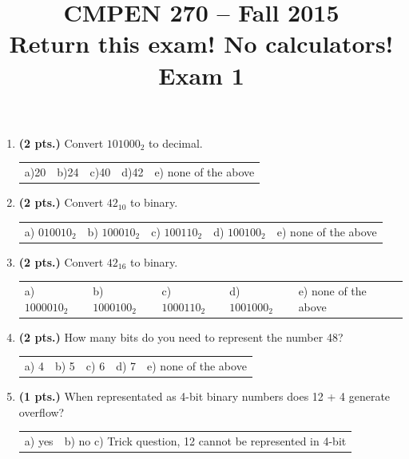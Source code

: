 \documentclass{article}
\begin{document}
\newcommand{\SOPmin}{${\rm SOP}_{\rm min} \ $}
\newcommand{\POSmin}{${\rm POS}_{\rm min} \ $}
\newcommand{\bs}{\backslash}


\title{
\Huge{CMPEN 270 -- Fall 2015}\\
\normalsize{Return this exam!  No calculators!}\\
\normalsize{Exam 1}\\
 }
\date{}

\maketitle{}


\begin{enumerate}

\item {\bf (2 pts.)} Convert $101000_2$ to decimal.

\begin{tabular}{p{0.7in} p{0.7in} p{0.7in} p{0.7in} l}
a)20 & b)24  & c)40  & d)42  & e) none of the above
\end{tabular}

\item {\bf (2 pts.)} Convert $42_{10}$ to binary.

\begin{tabular}{p{0.7in} p{0.7in} p{0.7in} p{0.7in} l}
a) $010010_2$ & b) $100010_2$ & c) $100110_2$ & d) $100100_2$ & e) none of the above
\end{tabular}

\item {\bf (2 pts.)} Convert $42_{16}$ to binary.

\begin{tabular}{p{0.7in} p{0.7in} p{0.7in} p{0.7in} l}
a) $1000010_2$ & b) $1000100_2$ & c) $1000110_2$ & d) $1001000_2$ & e) none of the above
\end{tabular}

\item {\bf (2 pts.)} How many bits do you need to represent the number 48?

\begin{tabular}{p{0.7in} p{0.7in} p{0.7in} p{0.7in} l}
a) 4  & b) 5 & c) 6 & d) 7 & e) none of the above
\end{tabular}

\item {\bf (1 pts.)} When representated as 4-bit binary numbers does 12 + 4
generate overflow?

\begin{tabular}{p{0.7in} l}
a) yes & b) no  c) Trick question, 12 cannot be represented in 4-bit
\end{tabular}



\end{enumerate}
\end{document}
